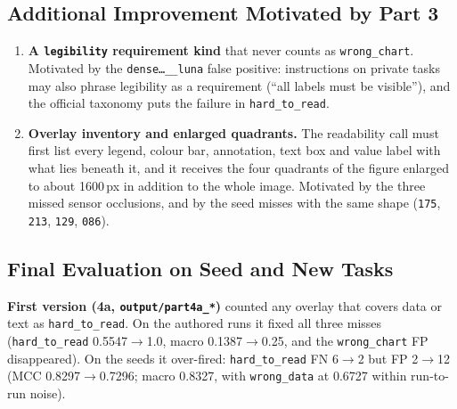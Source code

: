 \documentclass[11pt]{article}
\newcommand{\run}[1]{\texttt{#1}}
\begin{document}
\subsection{Additional Improvement Motivated by Part 3}
\begin{enumerate}
\item \textbf{A \texttt{legibility} requirement kind} that never counts as
\texttt{wrong\_chart}. Motivated by the \run{dense\ldots\_\_luna} false positive:
instructions on private tasks may also phrase legibility as a requirement
(``all labels must be visible''), and the official taxonomy puts the failure in
\texttt{hard\_to\_read}.
\item \textbf{Overlay inventory and enlarged quadrants.} The readability call must
first list every legend, colour bar, annotation, text box and value label with
what lies beneath it, and it receives the four quadrants of the figure enlarged to
about 1600\,px in addition to the whole image. Motivated by the three missed
sensor occlusions, and by the seed misses with the same shape (\run{175},
\run{213}, \run{129}, \run{086}).
\end{enumerate}

\subsection{Final Evaluation on Seed and New Tasks}
\textbf{First version (4a, \texttt{output/part4a\_*})} counted any overlay that
covers data or text as \texttt{hard\_to\_read}. On the authored runs it fixed
all three misses (\texttt{hard\_to\_read} 0.5547$\to$1.0, macro 0.1387$\to$0.25,
and the \texttt{wrong\_chart} FP disappeared). On the seeds it over-fired:
\texttt{hard\_to\_read} FN 6$\to$2 but FP 2$\to$12 (MCC 0.8297$\to$0.7296;
macro 0.8327, with \texttt{wrong\_data} at 0.6727 within run-to-run noise).
\end{document}
